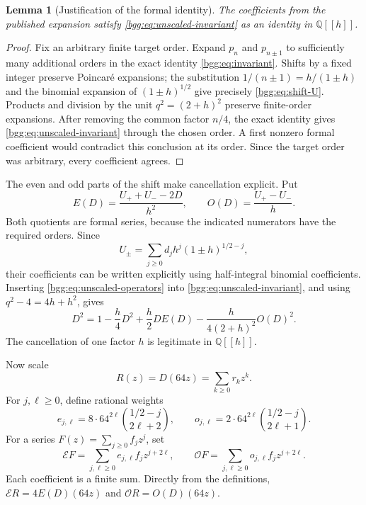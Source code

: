 \documentclass[11pt,a4paper]{article}
\numberwithin{equation}{section}
\newtheorem{lemma}[theorem]{Lemma}
\theoremstyle{definition}
\theoremstyle{remark}
\theoremstyle{definition}
\newcommand{\Q}{\mathbb Q}
\newcommand{\Eop}{\mathcal E}
\newcommand{\Oop}{\mathcal O}
\begin{document}
\begin{lemma}[Justification of the formal identity]\label{bgg:lem:formal-bridge}
The coefficients from the published expansion satisfy
\eqref{bgg:eq:unscaled-invariant} as an identity in $\Q[[h]]$.
\end{lemma}

\begin{proof}
Fix an arbitrary finite target order. Expand $p_n$ and $p_{n\pm1}$ to
sufficiently many additional orders in the exact identity
\eqref{bgg:eq:invariant}. Shifts by a fixed integer preserve Poincar\'e
expansions; the substitution $1/(n\pm1)=h/(1\pm h)$ and the binomial expansion
of $(1\pm h)^{1/2}$ give precisely \eqref{bgg:eq:shift-U}. Products and division
by the unit $q^2=(2+h)^2$ preserve finite-order expansions. After removing the
common factor $n/4$, the exact identity gives
\eqref{bgg:eq:unscaled-invariant} through the chosen order. A first nonzero formal
coefficient would contradict this conclusion at its order. Since the target
order was arbitrary, every coefficient agrees.
\end{proof}

The even and odd parts of the shift make cancellation explicit. Put
\begin{equation}\label{bgg:eq:unscaled-operators}
 E(D)=\frac{U_++U_--2D}{h^2},\qquad
 O(D)=\frac{U_+-U_-}{h}.
\end{equation}
Both quotients are formal series, because the indicated numerators have the
required orders. Since
\[
 U_\pm=\sum_{j\ge0}d_jh^j(1\pm h)^{1/2-j},
\]
their coefficients can be written explicitly using half-integral binomial
coefficients. Inserting \eqref{bgg:eq:unscaled-operators} into
\eqref{bgg:eq:unscaled-invariant}, and using $q^2-4=4h+h^2$, gives
\begin{equation}\label{bgg:eq:D-master}
 D^2=1-\frac h4D^2+\frac h2DE(D)
       -\frac{h}{4(2+h)^2}O(D)^2.
\end{equation}
The cancellation of one factor $h$ is legitimate in $\Q[[h]]$.

Now scale
\begin{equation}\label{bgg:eq:R-definition}
 R(z)=D(64z)=\sum_{k\ge0}r_kz^k.
\end{equation}
For $j,\ell\ge0$, define rational weights
\begin{equation}\label{bgg:eq:weights}
 e_{j,\ell}=8\cdot64^{2\ell}\binom{1/2-j}{2\ell+2},\qquad
 o_{j,\ell}=2\cdot64^{2\ell}\binom{1/2-j}{2\ell+1}.
\end{equation}
For a series $F(z)=\sum_{j\ge0}f_jz^j$, set
\begin{equation}\label{bgg:eq:scaled-operators}
 \Eop F=\sum_{j,\ell\ge0}e_{j,\ell}f_jz^{j+2\ell},\qquad
 \Oop F=\sum_{j,\ell\ge0}o_{j,\ell}f_jz^{j+2\ell}.
\end{equation}
Each coefficient is a finite sum. Directly from the definitions,
$\Eop R=4E(D)(64z)$ and $\Oop R=O(D)(64z)$.
\end{document}
